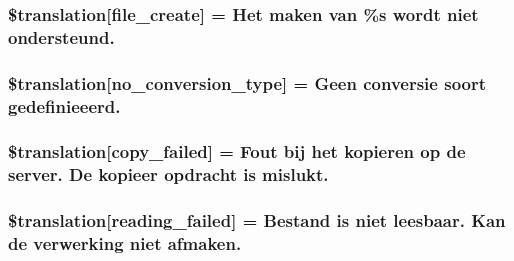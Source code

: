 \subsubsection[{\$translation}]{\setlength{\rightskip}{0pt plus 5cm}\$translation\mbox{[}\textquotesingle{}file\+\_\+create\textquotesingle{}\mbox{]} = \textquotesingle{}Het maken van \%s wordt niet ondersteund.\textquotesingle{}}\label{class_8upload_8nl___n_l_8php_a1ecb4673e4fb69e06b3f20b65cecf30a}
\hypertarget{class_8upload_8nl___n_l_8php_a4712d7ec28e9a7f17eb3338af2358363}{}
\subsubsection[{\$translation}]{\setlength{\rightskip}{0pt plus 5cm}\$translation\mbox{[}\textquotesingle{}no\+\_\+conversion\+\_\+type\textquotesingle{}\mbox{]} = \textquotesingle{}Geen conversie soort gedefinieeerd.\textquotesingle{}}\label{class_8upload_8nl___n_l_8php_a4712d7ec28e9a7f17eb3338af2358363}
\hypertarget{class_8upload_8nl___n_l_8php_a783c9358bcf54a054545b50098bc679b}{}
\subsubsection[{\$translation}]{\setlength{\rightskip}{0pt plus 5cm}\$translation\mbox{[}\textquotesingle{}copy\+\_\+failed\textquotesingle{}\mbox{]} = \textquotesingle{}Fout bij het kopieren op de server. De kopieer opdracht is mislukt.\textquotesingle{}}\label{class_8upload_8nl___n_l_8php_a783c9358bcf54a054545b50098bc679b}
\hypertarget{class_8upload_8nl___n_l_8php_a01bea14c9fd5f353f62db44beabfcd42}{}
\subsubsection[{\$translation}]{\setlength{\rightskip}{0pt plus 5cm}\$translation\mbox{[}\textquotesingle{}reading\+\_\+failed\textquotesingle{}\mbox{]} = \textquotesingle{}Bestand is niet leesbaar. Kan de verwerking niet afmaken.\textquotesingle{}}\label{class_8upload_8nl___n_l_8php_a01bea14c9fd5f353f62db44beabfcd42}
